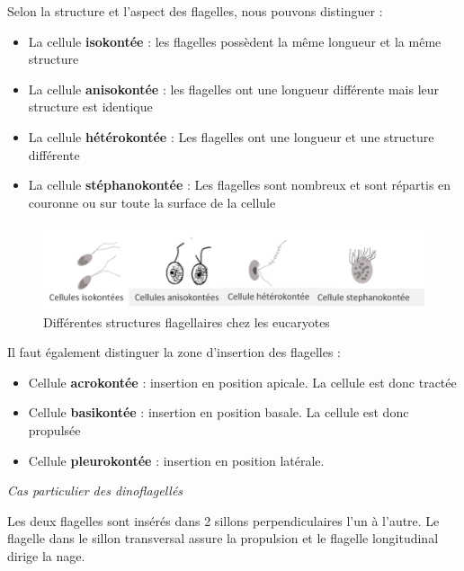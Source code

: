 \documentclass[
]{book}
\providecommand{\tightlist}{%
  \setlength{\itemsep}{0pt}\setlength{\parskip}{0pt}}
\begin{document}
Selon la structure et l'aspect des flagelles, nous pouvons distinguer :

\begin{itemize}
\tightlist
\item
  La cellule \textbf{isokontée} : les flagelles possèdent la même longueur et la même structure
\item
  La cellule \textbf{anisokontée} : les flagelles ont une longueur différente mais leur structure est identique
\item
  La cellule \textbf{hétérokontée} : Les flagelles ont une longueur et une structure différente
\item
  La cellule \textbf{stéphanokontée} : Les flagelles sont nombreux et sont répartis en couronne ou sur toute la surface de la cellule
\end{itemize}

\begin{figure}[H]

{\centering \includegraphics[width=13.69in]{images/cellules_flagelles} 

}

\caption{Différentes structures flagellaires chez les eucaryotes}\label{fig:cellules-flagelles}
\end{figure}

Il faut également distinguer la zone d'insertion des flagelles :

\begin{itemize}
\tightlist
\item
  Cellule \textbf{acrokontée} : insertion en position apicale. La cellule est donc tractée
\item
  Cellule \textbf{basikontée} : insertion en position basale. La cellule est donc propulsée
\item
  Cellule \textbf{pleurokontée} : insertion en position latérale.
\end{itemize}

\emph{Cas particulier des dinoflagellés}

Les deux flagelles sont insérés dans 2 sillons perpendiculaires l'un à l'autre. Le flagelle dans le sillon transversal assure la propulsion et le flagelle longitudinal dirige la nage.
\end{document}
